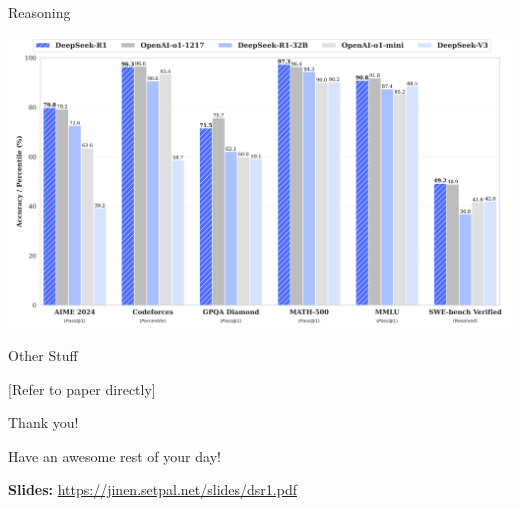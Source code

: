 \documentclass{beamer}
\begin{document}
\begin{frame}{Reasoning}
	\begin{center}
		\includegraphics[width=\textwidth]{img/benchmarks.png}
	\end{center}
\end{frame}

\begin{frame}{Other Stuff}
	\begin{center}
		[Refer to paper directly]
	\end{center}
\end{frame}

\begin{frame}{Thank you!}
	\begin{center}
		Have an awesome rest of your day!
	\end{center}
	\begin{center}
		\textbf{Slides:} \url{https://jinen.setpal.net/slides/dsr1.pdf}
	\end{center}
\end{frame}
\end{document}
